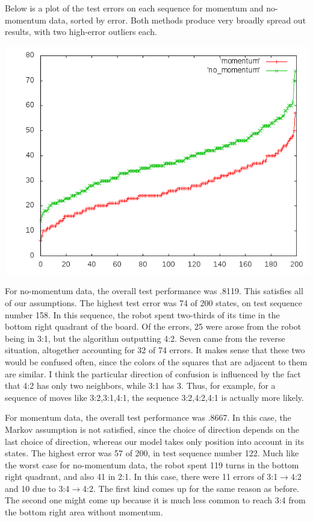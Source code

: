 \documentclass{article}
\begin{document}
\begin{enumerate}[(a)]
\begin{enumerate}
    Below is a plot of the test errors on each sequence for momentum
    and no-momentum data, sorted by error. Both methods produce very
    broadly spread out results, with two high-error outliers each.
    \begin{center}
      \includegraphics[scale=.45]{robot_cumul_perf.png}
    \end{center}

    For no-momentum data, the overall test performance was .8119. This
    satisfies all of our assumptions. The highest test error was 74 of
    200 states, on test sequence number 158. In this sequence, the
    robot spent two-thirds of its time in the bottom right quadrant of
    the board. Of the errors, 25 were arose from the robot being in
    3:1, but the algorithm outputting 4:2. Seven came from the reverse
    situation, altogether accounting for 32 of 74 errors. It makes
    sense that these two would be confused often, since the colors of
    the squares that are adjacent to them are similar. I think the
    particular direction of confusion is influenced by the fact that
    4:2 has only two neighbors, while 3:1 has 3. Thus, for example,
    for a sequence of moves like 3:2,3:1,4:1, the sequence 3:2,4:2,4:1
    is actually more likely.

    For momentum data, the overall test performance was .8667. In this
    case, the Markov assumption is not satisfied, since the choice of
    direction depends on the last choice of direction, whereas our
    model takes only position into account in its states. The highest
    error was 57 of 200, in test sequence number 122. Much like the
    worst case for no-momentum data, the robot spent 119 turns in the
    bottom right quadrant, and also 41 in 2:1. In this case, there
    were 11 errors of 3:1$\to$4:2 and 10 due to 3:4$\to$4:2. The first
    kind comes up for the same reason as before. The second one might
    come up because it is much less common to reach 3:4 from the
    bottom right area without momentum.


\end{enumerate}
\end{enumerate}
\end{document}
